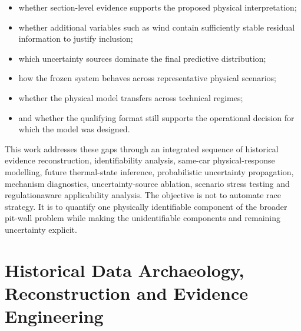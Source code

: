 \begin{itemize}
\item whether section-level evidence supports the proposed physical interpretation;
\item whether additional variables such as wind contain sufficiently stable residual information to justify inclusion;
\item which uncertainty sources dominate the final predictive distribution;
\item how the frozen system behaves across representative physical scenarios;
\item whether the physical model transfers across technical regimes;
\item and whether the qualifying format still supports the operational decision for which the model was designed.
\end{itemize}

This work addresses these gaps through an integrated sequence of historical evidence reconstruction, identifiability analysis, same-car physical-response modelling, future thermal-state inference, probabilistic uncertainty propagation, mechanism diagnostics, uncertainty-source ablation, scenario stress testing and regulationaware applicability analysis. The objective is not to automate race strategy. It is to quantify one physically identifiable component of the broader pit-wall problem while making the unidentifiable components and remaining uncertainty explicit.

\section{Historical Data Archaeology, Reconstruction and Evidence Engineering}

